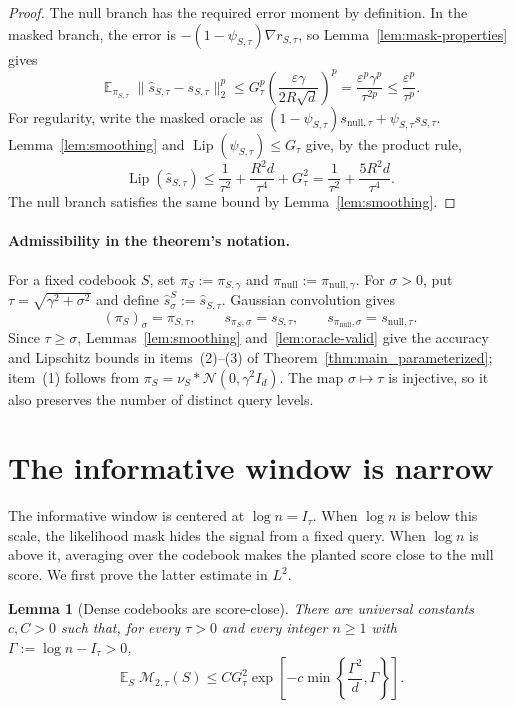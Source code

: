 \documentclass[11pt,letterpaper]{article}
\newtheorem{lemma}[theorem]{Lemma}
\DeclareMathOperator*{\E}{\mathbb{E}}
\newcommand{\eps}{\varepsilon}
\newcommand{\1}{\mathbbm{1}}
\DeclareMathOperator{\Lip}{Lip}
\newcommand{\cN}{\mathcal N}
\begin{document}
\begin{proof}
The null branch has the required error moment by definition.  In the
masked branch, the error is
\(-(1-\psi_{S,\tau})\nabla r_{S,\tau}\), so
Lemma~\ref{lem:mask-properties} gives
\[
   \E_{\pi_{S,\tau}}
      \|\widehat s_{S,\tau}-s_{S,\tau}\|_2^p
   \le G_\tau^p\left(\frac{\eps\gamma}{2R\sqrt d}\right)^p
   =\frac{\eps^p\gamma^p}{\tau^{2p}}
   \le\frac{\eps^p}{\tau^p}.
\]
For regularity, write the masked oracle as
\((1-\psi_{S,\tau})s_{\mathrm{null},\tau}
+\psi_{S,\tau}s_{S,\tau}\).
Lemma~\ref{lem:smoothing} and \(\Lip(\psi_{S,\tau})\le G_\tau\)
give, by the product rule,
\[
   \Lip(\widehat s_{S,\tau})
   \le\frac1{\tau^2}+\frac{R^2d}{\tau^4}+G_\tau^2
   =\frac1{\tau^2}+\frac{5R^2d}{\tau^4}.
\]
The null branch satisfies the same bound by Lemma~\ref{lem:smoothing}.
\end{proof}


\paragraph{Admissibility in the theorem's notation.}

For a fixed codebook \(S\), set \(\pi_S:=\pi_{S,\gamma}\) and
\(\pi_{\mathrm{null}}:=\pi_{\mathrm{null},\gamma}\).
For \(\sigma>0\), put \(\tau=\sqrt{\gamma^2+\sigma^2}\) and define
\(\widehat s^S_\sigma:=\widehat s_{S,\tau}\).  Gaussian convolution gives
\[
   (\pi_S)_\sigma=\pi_{S,\tau},
   \qquad s_{\pi_S,\sigma}=s_{S,\tau},
   \qquad s_{\pi_{\mathrm{null}},\sigma}=s_{\mathrm{null},\tau}.
\]
Since \(\tau\ge\sigma\), Lemmas~\ref{lem:smoothing}
and~\ref{lem:oracle-valid} give the accuracy and Lipschitz bounds in
items~\textup{(2)}--\textup{(3)} of
Theorem~\ref{thm:main_parameterized}; item~\textup{(1)} follows from
\(\pi_S=\nu_S*\cN(0,\gamma^2I_d)\).
The map \(\sigma\mapsto\tau\) is injective, so it also preserves
the number of distinct query levels.

\section{The informative window is narrow}
\label{sec:window}

The informative window is centered at \(\log n=I_\tau\).
When \(\log n\) is below this scale, the likelihood mask hides the
signal from a fixed query.  When \(\log n\) is above it, averaging
over the codebook makes the planted score close to the null score.
We first prove the latter estimate in \(L^2\).

\begin{lemma}[Dense codebooks are score-close]\label{lem:dense-score}
There are universal constants \(c,C>0\) such that, for every
\(\tau>0\) and every integer \(n\ge1\) with
\(\Gamma:=\log n-I_\tau>0\),
\[
   \E_S\mathcal M_{2,\tau}(S)
   \le C G_\tau^2
      \exp\left[-c\min\left\{\frac{\Gamma^2}{d},\Gamma\right\}\right].
\]
\end{lemma}
\end{document}
